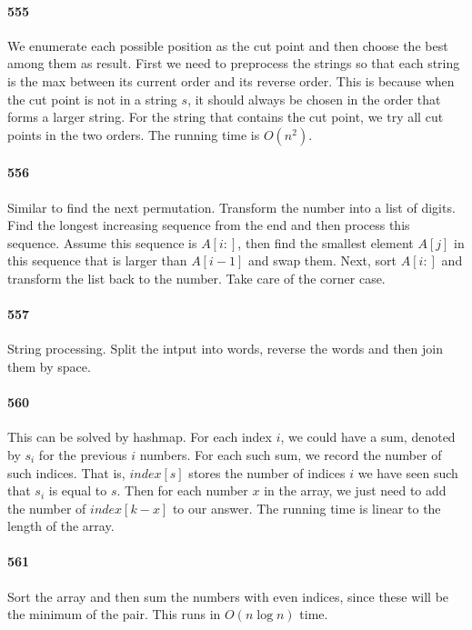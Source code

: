 \documentclass[11pt]{article}
\begin{document}
\paragraph{555}
We enumerate each possible position as the cut point and then choose the best among them as result. 
First we need to preprocess the strings so that each string is the max between its current order and its reverse order.
This is because when the cut point is not in a string $s$, it should always be chosen in the order that forms a larger string.
For the string that contains the cut point, we try all cut points in the two orders. The running time is $O(n^2)$. 

\paragraph{556}
Similar to find the next permutation. Transform the number into a list of digits. 
Find the longest increasing sequence from the end and then process this sequence.
Assume this sequence is $A[i:]$, then find the smallest element $A[j]$ in this sequence that is larger than $A[i-1]$ and swap
them. Next, sort $A[i:]$ and transform the list back to the number. Take care of the corner case.

\paragraph{557}
String processing. Split the intput into words, reverse the words and then join them by space.

\paragraph{560}
This can be solved by hashmap. For each index $i$, we could have a sum, denoted by $s_i$ for the previous $i$ numbers. 
For each such sum, we record the number of such indices. 
That is, $index[s]$ stores the number of indices $i$ we have seen such that $s_i$ is equal to $s$.
Then for each number $x$ in the array, we just need to add the number of $index[k-x]$ to our answer.
The running time is linear to the length of the array.




\paragraph{561}
Sort the array and then sum the numbers with even indices, since these will be the minimum of the pair. 
This runs in $O(n \log n)$ time.
\end{document}
